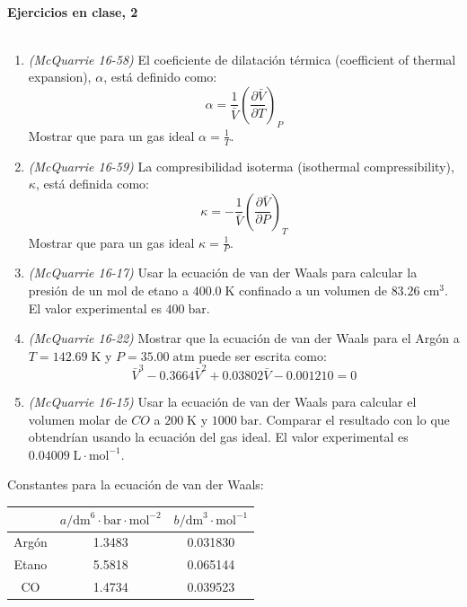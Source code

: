 \documentclass[a4paper,12pt]{article}
\begin{document}

\begin{center}
\HRule \\[0.4cm]
{ \bfseries Ejercicios en clase, 2}\\ %
\HRule \\[0.4cm]
\end{center}


\begin{enumerate}

 \item \textit{(McQuarrie 16-58)} El coeficiente de dilataci\'on t\'ermica (coefficient of thermal expansion), $\alpha$, est\'a definido como:
$$\alpha=\frac{1}{\bar{V}}\left(\frac{\partial \bar{V}}{\partial T}\right)_P$$
Mostrar que para un gas ideal $\alpha=\frac{1}{T}$. %

 \item \textit{(McQuarrie 16-59)} La compresibilidad isoterma (isothermal compressibility), $\kappa$, est\'a definida como:
$$\kappa=-\frac{1}{\bar{V}}\left(\frac{\partial \bar{V}}{\partial P}\right)_T$$
Mostrar que para un gas ideal $\kappa=\frac{1}{P}$. %

 \item \textit{(McQuarrie 16-17)} Usar la ecuaci\'on de van der Waals para calcular la presi\'on de un mol de etano a $400.0\;\mbox{K}$ confinado a un volumen de $83.26\;\mbox{cm}^3$. El valor experimental es $400\;\mbox{bar}$. %

 \item \textit{(McQuarrie 16-22)} Mostrar que la ecuaci\'on de van der Waals para el Arg\'on a $T=142.69\;\mbox{K}$ y $P=35.00\;\mbox{atm}$ puede ser escrita como:
$$\bar{V}^3-0.3664\bar{V}^2+0.03802\bar{V}-0.001210=0$$ %

 \item \textit{(McQuarrie 16-15)} Usar la ecuaci\'on de van der Waals para calcular el volumen molar de $CO$ a $200\;\mbox{K}$ y $1000\;\mbox{bar}$. Comparar el resultado con lo que obtendr\'ian usando la ecuaci\'on del gas ideal. El valor experimental es $0.04009\;\mbox{L}\cdot\mbox{mol}^{-1}$. %

\end{enumerate}

Constantes para la ecuaci\'on de van der Waals:
\begin{center}
\begin{tabular}{c|c|c}
 & $a/\mbox{dm}^6\cdot\mbox{bar}\cdot\mbox{mol}^{-2}$ & $b/\mbox{dm}^3\cdot\mbox{mol}^{-1}$ \\\hline
Arg\'on & 1.3483 & 0.031830\\
Etano & 5.5818 & 0.065144 \\
CO & 1.4734 & 0.039523
\end{tabular}
\end{center}
 
\end{document}

